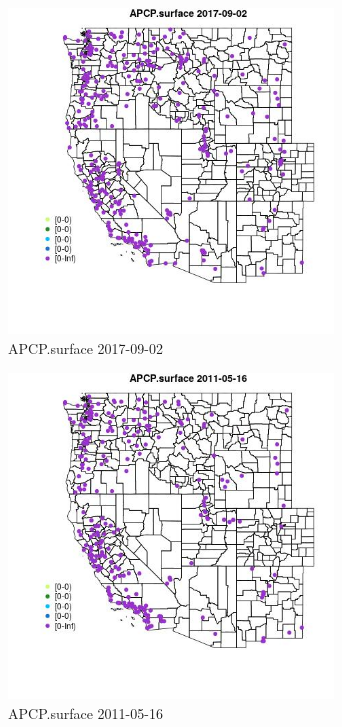 \begin{figure} 
\centering  
\includegraphics[width=0.77\textwidth]{Code_Outputs/Report_ML_input_PM25_Step4_part_e_de_duplicated_aves_compiled_2019-05-20wNAs_MapObsAPCPsurface2017-09-02.jpg} 
\caption{\label{fig:Report_ML_input_PM25_Step4_part_e_de_duplicated_aves_compiled_2019-05-20wNAsMapObsAPCPsurface2017-09-02}APCP.surface 2017-09-02} 
\end{figure} 
 

\begin{figure} 
\centering  
\includegraphics[width=0.77\textwidth]{Code_Outputs/Report_ML_input_PM25_Step4_part_e_de_duplicated_aves_compiled_2019-05-20wNAs_MapObsAPCPsurface2011-05-16.jpg} 
\caption{\label{fig:Report_ML_input_PM25_Step4_part_e_de_duplicated_aves_compiled_2019-05-20wNAsMapObsAPCPsurface2011-05-16}APCP.surface 2011-05-16} 
\end{figure} 
 

